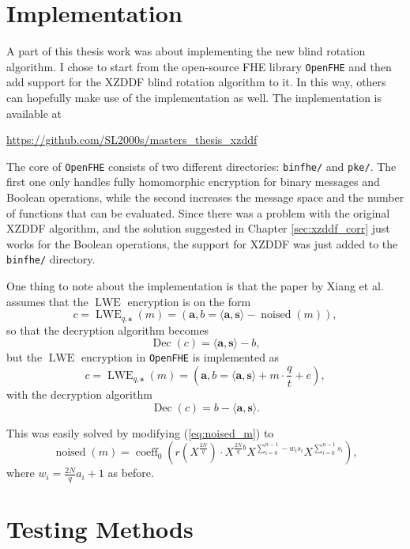 \section{Implementation}

A part of this thesis work was about implementing the new blind rotation algorithm. I chose to start from the open-source FHE library \texttt{OpenFHE} and then add support for the XZDDF blind rotation algorithm to it. In this way, others can hopefully make use of the implementation as well. The implementation is available at
\begin{center}
\url{https://github.com/SL2000s/masters_thesis_xzddf}
\end{center}

The core of \texttt{OpenFHE} consists of two different directories: \texttt{binfhe/} and \texttt{pke/}. The first one only handles fully homomorphic encryption for binary messages and Boolean operations, while the second increases the message space and the number of functions that can be evaluated. Since there was a problem with the original XZDDF algorithm, and the solution suggested in Chapter \ref{sec:xzddf_corr} just works for the Boolean operations, the support for XZDDF was just added to the \texttt{binfhe/} directory.

One thing to note about the implementation is that the paper by Xiang et al. \cite{cite:fast_bootstrap_crypto23} assumes that the $\operatorname{LWE}$ encryption is on the form 
$$c = \operatorname{LWE}_{q,\mathbf{s}}(m) = \left(\mathbf{a}, b = \langle \mathbf{a}, \mathbf{s} \rangle - \operatorname{noised}(m)\right),$$
so that the decryption algorithm becomes 
$$\operatorname{Dec}(c) = \langle \mathbf{a}, \mathbf{s} \rangle - b,$$
but the $\operatorname{LWE}$ encryption in \texttt{OpenFHE} is implemented as
$$c = \operatorname{LWE}_{q,\mathbf{s}}(m) = \left(\mathbf{a}, b = \langle \mathbf{a}, \mathbf{s} \rangle + m \cdot \frac{q}{t} + e\right),$$
with the decryption algorithm
$$\operatorname{Dec}(c) = b - \langle \mathbf{a}, \mathbf{s} \rangle.$$

This was easily solved by modifying (\ref{eq:noised_m}) to
$$\operatorname{noised}(m) = \operatorname{coeff}_0 \left(r(X^{\frac{2N}{q}}) \cdot X^{\frac{2N}{q}b} X^{\sum_{i=0}^{n-1}-w_is_i} X^{\sum_{i=0}^{n-1}s_i}\right),$$
where $w_i=\frac{2N}{q}a_i+1$ as before.

\section{Testing Methods}\label{subsec:methods}

